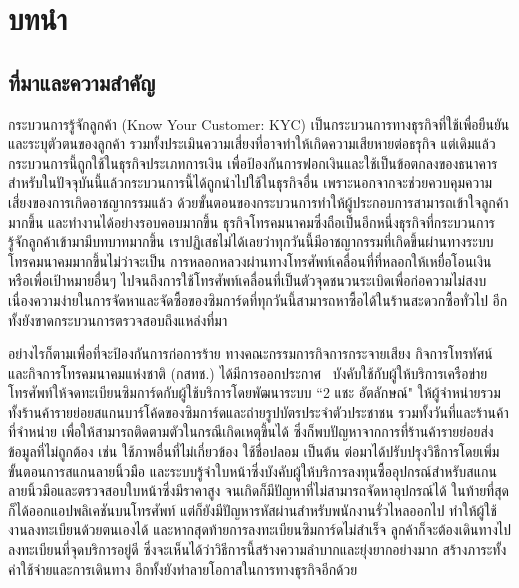 \chapter{บทนำ}
\label{chapter:introduction}

\section{ที่มาและความสำคัญ}

กระบวนการรู้จักลูกค้า (Know Your Customer: KYC) เป็นกระบวนการทางธุรกิจที่ใช้เพื่อยืนยันและระบุตัวตนของลูกค้า รวมทั้งประเมินความเสี่ยงที่อาจทำให้เกิดความเสียหายต่อธรุกิจ แต่เดิมแล้ว กระบวนการนี้ถูกใช้ในธุรกิจประเภทการเงิน เพื่อป้องกันการฟอกเงินและใช้เป็นข้อตกลงของธนาคาร สำหรับในปัจจุบันนี้แล้วกระบวนการนี้ได้ถูกนำไปใช้ในธุรกิจอื่น เพราะนอกจากจะช่วยควบคุมความเสี่ยงของการเกิดอาชญากรรมแล้ว ด้วยขั้นตอนของกระบวนการทำให้ผู้ประกอบการสามารถเข้าใจลูกค้ามากขึ้น และทำงานได้อย่างรอบคอบมากขึ้น ธุรกิจโทรคมนาคมซึ่งถือเป็นอีกหนึ่งธุรกิจที่กระบวนการรู้จักลูกค้าเข้ามามีบทบาทมากขึ้น เราปฏิเสธไม่ได้เลยว่าทุกวันนี้มีอาชญากรรมที่เกิดขึ้นผ่านทางระบบโทรคมนาคมมากขึ้นไม่ว่าจะเป็น การหลอกหลวงผ่านทางโทรศัพท์เคลื่อนที่ที่หลอกให้เหยื่อโอนเงินหรือเพื่อเป้าหมายอื่นๆ ไปจนถึงการใช้โทรศัพท์เคลื่อนที่เป็นตัวจุดชนวนระเบิดเพื่อก่อความไม่สงบ เนื่องความง่ายในการจัดหาและจัดซื้อของซิมการ์ดที่ทุกวันนี้สามารถหาซื้อได้ในร้านสะดวกซื้อทั่วไป อีกทั้งยังขาดกระบวนการตรวจสอบถึงแหล่งที่มา

อย่างไรก็ตามเพื่อที่จะป้องกันการก่อการร้าย ทางคณะกรรมการกิจการกระจายเสียง กิจการโทรทัศน์ และกิจการโทรคมนาคมแห่งชาติ (กสทช.) ได้มีการออกประกาศ~\cite{NBTCAnnouncement} บังคับใช้กับผู้ให้บริการเครือข่ายโทรศัพท์ให้จดทะเบียนซิมการ์ดกับผู้ใช้บริการโดยพัฒนาระบบ ``2 แชะ อัตลักษณ์" ให้ผู้จำหน่ายรวมทั้งร้านค้ารายย่อยสแกนบาร์โค้ดของซิมการ์ดและถ่ายรูปบัตรประจำตัวประชาชน รวมทั้งวันที่และร้านค้าที่จำหน่าย เพื่อให้สามารถติดตามตัวในกรณีเกิดเหตุขึ้นได้ ซึ่งก็พบปัญหาจากการที่ร้านค้ารายย่อยส่งข้อมูลที่ไม่ถูกต้อง เช่น ใช้ภาพอื่นที่ไม่เกี่ยวข้อง ใช้ชื่อปลอม เป็นต้น ต่อมาได้ปรับปรุงวิธีการโดยเพิ่มขั้นตอนการสแกนลายนิ้วมือ และระบบรู้จำใบหน้าซึ่งบังคับผู้ให้บริการลงทุนซื้ออุปกรณ์สำหรับสแกนลายนิ้วมือและตรวจสอบใบหน้าซึ่งมีราคาสูง จนเกิดก็มีปัญหาที่ไม่สามารถจัดหาอุปกรณ์ได้ ในท้ายที่สุดก็ได้ออกแอปพลิเคชันบนโทรศัพท์ แต่ก็ยังมีปัญหารหัสผ่านสำหรับพนักงานรั่วไหลออกไป ทำให้ผู้ใช้งานลงทะเบียนด้วยตนเองได้ และหากสุดท้ายการลงทะเบียนซิมการ์ดไม่สำเร็จ ลูกค้าก็จะต้องเดินทางไปลงทะเบียนที่จุดบริการอยู่ดี ซึ่งจะเห็นได้ว่าวิธีการนี้สร้างความลำบากและยุ่งยากอย่างมาก สร้างภาระทั้งค่าใช้จ่ายและการเดินทาง อีกทั้งยังทำลายโอกาสในการทางธุรกิจอีกด้วย

